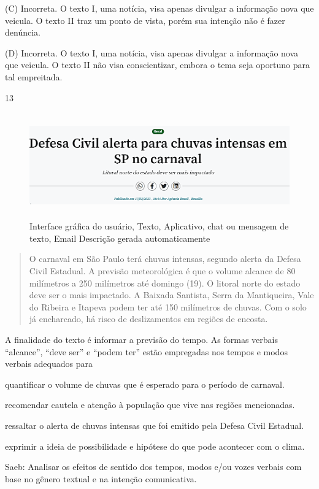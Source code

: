 (C) Incorreta. O texto I, uma notícia, visa apenas divulgar a informação
nova que veicula. O texto II traz um ponto de vista, porém sua intenção
não é fazer denúncia.

(D) Incorreta. O texto I, uma notícia, visa apenas divulgar a informação
nova que veicula. O texto II não visa conscientizar, embora o tema seja
oportuno para tal empreitada.

\num{13}

\begin{figure}
\centering
\includegraphics[width=5.90556in,height=1.78681in]{./imgSAEB_8_POR/media/image4.png}
\caption{Interface gráfica do usuário, Texto, Aplicativo, chat ou
mensagem de texto, Email Descrição gerada automaticamente}
\end{figure}

\begin{quote}
O carnaval em São Paulo terá chuvas intensas, segundo alerta da Defesa
Civil Estadual. A previsão meteorológica é que o volume alcance de 80
milímetros a 250 milímetros até domingo (19). O litoral norte do estado
deve ser o mais impactado. A Baixada Santista, Serra da Mantiqueira,
Vale do Ribeira e Itapeva podem ter até 150 milímetros de chuvas. Com o
solo já encharcado, há risco de deslizamentos em regiões de encosta.
\end{quote}


A finalidade do texto é informar a previsão do tempo. As formas verbais
``alcance'', ``deve ser'' e ``podem ter'' estão empregadas nos tempos e
modos verbais adequados para

\begin{escolha}
\item quantificar o volume de chuvas que é esperado para o período de
carnaval.

\item recomendar cautela e atenção à população que vive nas regiões
mencionadas.

\item ressaltar o alerta de chuvas intensas que foi emitido pela Defesa
Civil Estadual.

\item exprimir a ideia de possibilidade e hipótese do que pode acontecer
com o clima.
\end{escolha}
Saeb: Analisar os efeitos de sentido dos tempos, modos e/ou vozes
verbais com base no gênero textual e na intenção comunicativa.

